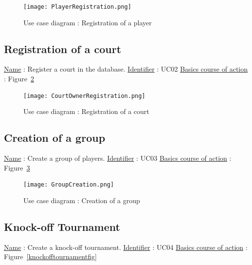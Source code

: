 \begin{figure}[!ht]
    \centering
    \texttt{[image: PlayerRegistration.png]}
    \caption{Use case diagram : Registration of a player}
    \label{playerregistrationfig}
\end{figure}
\FloatBarrier

\subsection{Registration of a court}

\noindent \underline{Name} : Register a court in the database. \newline
\underline{Identifier} : UC02 \newline
\underline{Basics course of action} : Figure~\ref{courtownerregfig} \newline

\begin{figure}[!ht]
    \centering
    \texttt{[image: CourtOwnerRegistration.png]}
    \caption{Use case diagram : Registration of a court}
    \label{courtownerregfig}
\end{figure}
\FloatBarrier

\subsection{Creation of a group}

\noindent \underline{Name} : Create a group of players. \newline
\underline{Identifier} : UC03 \newline
\underline{Basics course of action} : Figure~\ref{groupcreationfig} \newline

\begin{figure}[!ht]
    \centering
    \texttt{[image: GroupCreation.png]}
    \caption{Use case diagram : Creation of a group}
    \label{groupcreationfig}
\end{figure}
\FloatBarrier

\subsection{Knock-off Tournament}

\noindent \underline{Name} : Create a knock-off tournament. \newline
\underline{Identifier} : UC04 \newline
\underline{Basics course of action} : Figure~\ref{knockofftournamentfig}\newline

